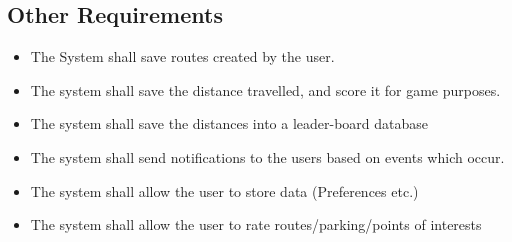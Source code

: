 \documentclass{article}
\begin{document}
        \subsection{Other Requirements}
			\begin{itemize}
  				\item The System shall save routes created by the user.
				\item The system shall save the distance travelled, and score it for game purposes.
				\item The system shall save the distances into a leader-board database
				\item The system shall send notifications to the users based on events which occur.
				\item The system shall allow the user to store data (Preferences etc.)
				\item The system shall allow the user to rate routes/parking/points of interests
			\end{itemize}	
\end{document}
